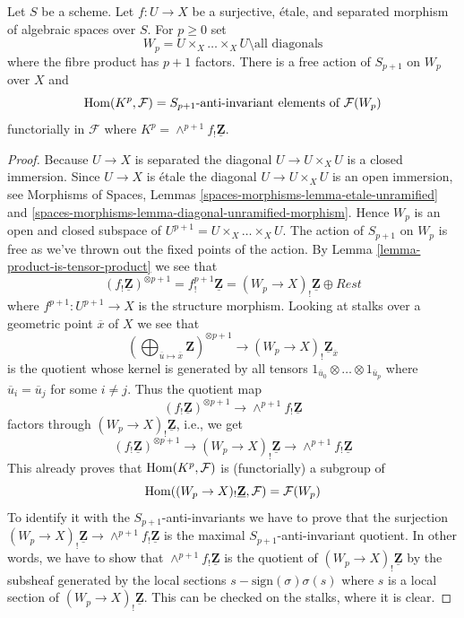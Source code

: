 \begin{lemma}
\label{lemma-compute}
Let $S$ be a scheme. Let $f : U \to X$ be a surjective, \'etale, and separated
morphism of algebraic spaces over $S$. For $p \geq 0$ set
$$
W_p = U \times_X \ldots \times_X U \setminus \text{all diagonals}
$$
where the fibre product has $p + 1$ factors.
There is a free action of $S_{p + 1}$ on $W_p$ over $X$ and
$$
\mathop{\mathrm{Hom}}\nolimits(K^p, \mathcal{F}) = S_{p + 1}\text{-anti-invariant elements of }
\mathcal{F}(W_p)
$$
functorially in $\mathcal{F}$ where
$K^p = \wedge^{p + 1}f_!\underline{\mathbf{Z}}$.
\end{lemma}

\begin{proof}
Because $U \to X$ is separated the diagonal $U \to U \times_X U$ is a
closed immersion. Since $U \to X$ is \'etale the diagonal
$U \to U \times_X U$ is an open immersion, see
Morphisms of Spaces, Lemmas
\ref{spaces-morphisms-lemma-etale-unramified} and
\ref{spaces-morphisms-lemma-diagonal-unramified-morphism}.
Hence $W_p$ is an open and closed subspace of
$U^{p + 1} = U \times_X \ldots \times_X U$. The action of $S_{p + 1}$
on $W_p$ is free as we've thrown out the fixed points of the action.
By
Lemma \ref{lemma-product-is-tensor-product}
we see that
$$
(f_!\underline{\mathbf{Z}})^{\otimes p + 1} =
f^{p + 1}_!\underline{\mathbf{Z}} = (W_p \to X)_!\underline{\mathbf{Z}}
\oplus Rest
$$
where $f^{p + 1} : U^{p + 1} \to X$ is the structure morphism.
Looking at stalks over a geometric point $\overline{x}$ of $X$
we see that
$$
\left(
\bigoplus\nolimits_{\overline{u} \mapsto \overline{x}} \mathbf{Z}
\right)^{\otimes p + 1}
\longrightarrow
(W_p \to X)_!\underline{\mathbf{Z}}_{\overline{x}}
$$
is the quotient whose kernel is generated by all tensors
$1_{\overline{u}_0} \otimes \ldots \otimes 1_{\overline{u}_p}$
where $\overline{u}_i = \overline{u}_j$ for some $i \not = j$.
Thus the quotient map
$$
(f_!\underline{\mathbf{Z}})^{\otimes p + 1}
\longrightarrow
\wedge^{p + 1}f_!\underline{\mathbf{Z}}
$$
factors through $(W_p \to X)_!\underline{\mathbf{Z}}$, i.e., we get
$$
(f_!\underline{\mathbf{Z}})^{\otimes p + 1}
\longrightarrow
(W_p \to X)_!\underline{\mathbf{Z}}
\longrightarrow
\wedge^{p + 1}f_!\underline{\mathbf{Z}}
$$
This already proves that $\mathop{\mathrm{Hom}}\nolimits(K^p, \mathcal{F})$ is (functorially) a
subgroup of
$$
\mathop{\mathrm{Hom}}\nolimits((W_p \to X)_!\underline{\mathbf{Z}}, \mathcal{F}) = \mathcal{F}(W_p)
$$
To identify it with the $S_{p + 1}$-anti-invariants we have to prove that
the surjection $(W_p \to X)_!\underline{\mathbf{Z}}
\to \wedge^{p + 1}f_!\underline{\mathbf{Z}}$ is the maximal
$S_{p + 1}$-anti-invariant quotient. In other words, we have to show that
$\wedge^{p + 1}f_!\underline{\mathbf{Z}}$ is the quotient of
$(W_p \to X)_!\underline{\mathbf{Z}}$ by the subsheaf generated by
the local sections $s - \text{sign}(\sigma)\sigma(s)$ where $s$ is
a local section of $(W_p \to X)_!\underline{\mathbf{Z}}$.
This can be checked on the stalks, where it is clear.
\end{proof}

